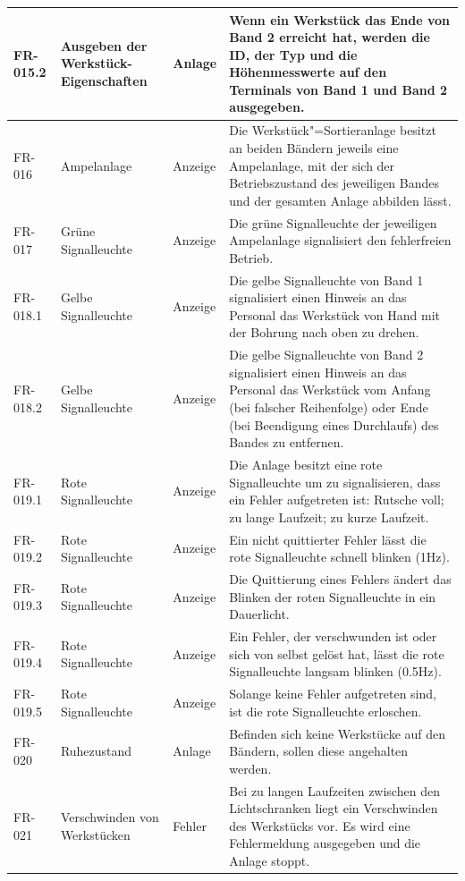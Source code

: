 \documentclass[oneside,a4paper,titlepage]{scrartcl} %
\begin{document}
\begin{small}
\begin{longtable}{|C{2cm}|L{4cm}|C{1.5cm}|L{5.5cm}|}
  \hline
  FR-015.2 & Ausgeben der Werkstück-Eigenschaften & Anlage & Wenn ein Werkstück das Ende von Band 2 erreicht hat, werden die ID, der Typ und die Höhenmesswerte auf den Terminals von Band 1 und Band 2 ausgegeben.\\
  \hline
   FR-016 & Ampelanlage & Anzeige & Die Werkstück"=Sortieranlage besitzt an beiden Bändern jeweils eine Ampelanlage, mit der sich der Betriebszustand des jeweiligen Bandes und der gesamten Anlage abbilden lässt.\\
  \hline
  FR-017 & Grüne Signalleuchte & Anzeige & Die grüne Signalleuchte der jeweiligen Ampelanlage signalisiert den fehlerfreien Betrieb.\\
  \hline
   FR-018.1 & Gelbe Signalleuchte & Anzeige & Die gelbe Signalleuchte von Band 1 signalisiert einen Hinweis an das Personal das Werkstück von Hand mit der Bohrung nach oben zu drehen.\\
  \hline
   FR-018.2 & Gelbe Signalleuchte & Anzeige & Die gelbe Signalleuchte von Band 2 signalisiert einen Hinweis an das Personal das Werkstück vom Anfang (bei falscher Reihenfolge) oder  Ende (bei Beendigung eines Durchlaufs) des Bandes zu entfernen.\\
  \hline
  FR-019.1 & Rote Signalleuchte & Anzeige & Die Anlage besitzt eine rote Signalleuchte um zu signalisieren, dass ein Fehler aufgetreten ist: Rutsche voll; zu lange Laufzeit; zu kurze Laufzeit.\\
  \hline
  FR-019.2 & Rote Signalleuchte & Anzeige & Ein nicht quittierter Fehler lässt die rote Signalleuchte schnell blinken (1Hz).\\
  \hline
  FR-019.3 & Rote Signalleuchte & Anzeige & Die Quittierung eines Fehlers ändert das Blinken der roten Signalleuchte in ein Dauerlicht.\\
  \hline
  FR-019.4 & Rote Signalleuchte & Anzeige & Ein Fehler, der verschwunden ist oder sich von selbst gelöst hat, lässt die rote Signalleuchte langsam blinken (0.5Hz).\\
  \hline
  FR-019.5 & Rote Signalleuchte & Anzeige & Solange keine Fehler aufgetreten sind, ist die rote Signalleuchte erloschen.\\
  \hline
   FR-020 & Ruhezustand & Anlage & Befinden sich keine Werkstücke auf den Bändern, sollen diese angehalten werden.\\
  \hline
  FR-021 & Verschwinden von Werkstücken & Fehler & Bei zu langen Laufzeiten zwischen den Lichtschranken liegt ein Verschwinden des Werkstücks vor. Es wird eine Fehlermeldung ausgegeben und die Anlage stoppt.\\

\end{longtable}
\end{small}
\end{document}
